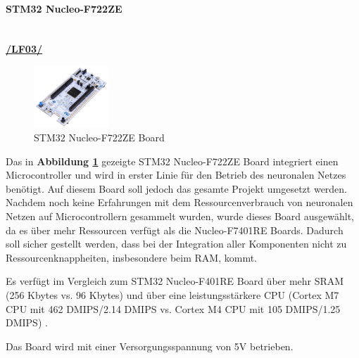 


\paragraph{STM32 Nucleo-F722ZE}\label{sec:stm32-nucleo-f722ze}\mbox{}\\

\textbf{\hyperlink{lf-nn-01}{/LF03/}} \\

\begin{figure} %
	\vspace{-10pt}
	\hspace{20pt}
	\centering
	\includegraphics[width=0.25\textwidth]{images/05_technische_spezifikation/nn/nucleo_f722ze.jpg}
	\caption{STM32 Nucleo-F722ZE Board}
	\label{fig:nucleo-f722ze}
\end{figure}


Das in \textbf{Abbildung \ref{fig:nucleo-f722ze}} gezeigte STM32 Nucleo-F722ZE Board integriert einen Microcontroller und wird in erster Linie für den Betrieb des neuronalen Netzes benötigt. Auf diesem Board soll jedoch das gesamte Projekt umgesetzt werden. Nachdem noch keine Erfahrungen mit dem Ressourcenverbrauch von neuronalen Netzen auf Microcontrollern gesammelt wurden, wurde dieses Board ausgewählt, da es über mehr Ressourcen verfügt als die Nucleo-F7401RE Boards. Dadurch soll sicher gestellt werden, dass bei der Integration aller Komponenten nicht zu Ressourcenknappheiten, insbesondere beim RAM, kommt.

Es verfügt im Vergleich zum STM32 Nucleo-F401RE Board über mehr SRAM (256 Kbytes vs. 96 Kbytes) und über eine leistungsstärkere CPU (Cortex M7 CPU mit 462 DMIPS/2.14 DMIPS vs. Cortex M4 CPU mit 105 DMIPS/1.25 DMIPS) \cite{stm32F7-board}. 

Das Board wird mit einer Versorgungsspannung von 5V betrieben. 